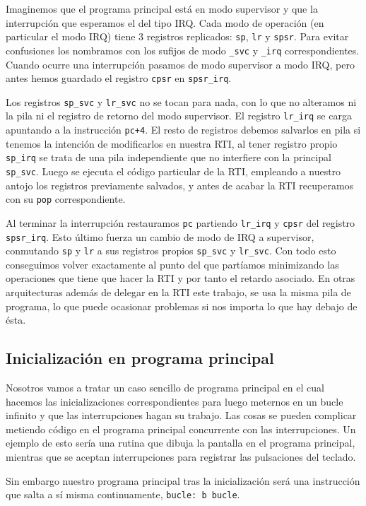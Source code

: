 Imaginemos que el programa principal está en modo supervisor y que la interrupción que
esperamos el del tipo IRQ.
Cada modo de operación (en particular el modo IRQ) tiene 3 registros replicados: {\tt sp}, {\tt lr} y {\tt spsr}.
Para evitar confusiones los nombramos con los sufijos de modo {\tt \_svc} y {\tt \_irq} correspondientes.
Cuando ocurre una interrupción pasamos de modo supervisor a modo IRQ, pero antes hemos guardado
el registro {\tt cpsr} en {\tt spsr\_irq}.

Los registros {\tt sp\_svc} y {\tt lr\_svc} no se tocan para nada, con lo que no alteramos ni la
pila ni el registro de retorno del modo supervisor. El registro {\tt lr\_irq} se carga apuntando a la
instrucción {\tt pc+4}. El resto de registros debemos salvarlos en pila si tenemos la intención
de modificarlos en nuestra RTI, al tener registro propio {\tt sp\_irq} se trata de una pila
independiente que no interfiere con la principal {\tt sp\_svc}. Luego se ejecuta el código
particular de la RTI, empleando a nuestro antojo los registros previamente salvados, y antes de
acabar la RTI recuperamos con su {\tt pop} correspondiente.

Al terminar la interrupción restauramos {\tt pc} partiendo {\tt lr\_irq} y {\tt cpsr} del registro
{\tt spsr\_irq}. Esto último fuerza un cambio de modo de IRQ a supervisor, conmutando {\tt sp} y {\tt lr}
a sus registros propios {\tt sp\_svc} y {\tt lr\_svc}. Con todo esto conseguimos volver exactamente
al punto del que partíamos minimizando las
operaciones que tiene que hacer la RTI y por tanto el retardo asociado. En otras arquitecturas
además de delegar en la RTI este trabajo, se usa la misma pila de programa, lo que puede
ocasionar problemas si nos importa lo que hay debajo de ésta.

\subsection{Inicialización en programa principal}

Nosotros vamos a tratar un caso sencillo de programa principal en el cual hacemos las
inicializaciones correspondientes para luego meternos en un bucle infinito y que las
interrupciones hagan su trabajo. Las cosas se pueden complicar metiendo código en
el programa principal concurrente con las interrupciones. Un ejemplo de esto sería
una rutina que dibuja la pantalla en el programa principal, mientras que se aceptan
interrupciones para registrar las pulsaciones del teclado.

Sin embargo nuestro programa principal tras la inicialización será una
instrucción que salta a sí misma continuamente, {\tt bucle: b bucle}.

